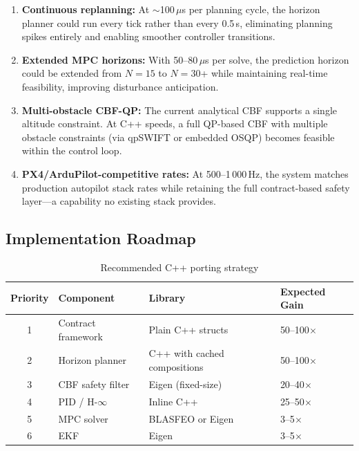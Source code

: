 \begin{enumerate}
    \item \textbf{Continuous replanning:} At $\sim$100\,$\mu$s per planning cycle, the horizon planner could run every tick rather than every 0.5\,s, eliminating planning spikes entirely and enabling smoother controller transitions.

    \item \textbf{Extended MPC horizons:} With 50--80\,$\mu$s per solve, the prediction horizon could be extended from $N=15$ to $N=30$+ while maintaining real-time feasibility, improving disturbance anticipation.

    \item \textbf{Multi-obstacle CBF-QP:} The current analytical CBF supports a single altitude constraint. At C++ speeds, a full QP-based CBF with multiple obstacle constraints (via qpSWIFT or embedded OSQP) becomes feasible within the control loop.

    \item \textbf{PX4/ArduPilot-competitive rates:} At 500--1\,000\,Hz, the system matches production autopilot stack rates while retaining the full contract-based safety layer---a capability no existing stack provides.
\end{enumerate}

\subsection{Implementation Roadmap}

\begin{table}[htbp]
    \centering
    \caption{Recommended C++ porting strategy}
    \label{tab:cpp_roadmap}
    \begin{tabular}{@{}clll@{}}
        \toprule
        \textbf{Priority} & \textbf{Component} & \textbf{Library} & \textbf{Expected Gain} \\
        \midrule
        1 & Contract framework & Plain C++ structs & 50--100$\times$ \\
        2 & Horizon planner & C++ with cached compositions & 50--100$\times$ \\
        3 & CBF safety filter & Eigen (fixed-size) & 20--40$\times$ \\
        4 & PID / H-$\infty$ & Inline C++ & 25--50$\times$ \\
        5 & MPC solver & BLASFEO or Eigen & 3--5$\times$ \\
        6 & EKF & Eigen & 3--5$\times$ \\
        \bottomrule
    \end{tabular}
\end{table}

